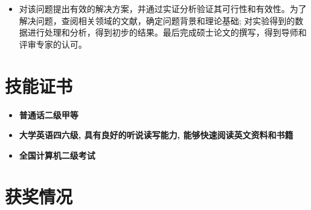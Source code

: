 \documentclass{resume}
\begin{document}
\begin{itemize}[parsep=0.5ex]
  \item 对该问题提出有效的解决方案，并通过实证分析验证其可行性和有效性。为了解决问题，查阅相关领域的文献，确定问题背景和理论基础; 对实验得到的数据进行处理和分析，得到初步的结果。最后完成硕士论文的撰写，得到导师和评审专家的认可。
\end{itemize}

\section{技能证书}

\begin{itemize}
  \item \textbf{普通话二级甲等}
  \item \textbf{大学英语四六级, 具有良好的听说读写能力, 能够快速阅读英文资料和书籍}
  \item \textbf{全国计算机二级考试}
\end{itemize}

\section{获奖情况}




\end{document}

